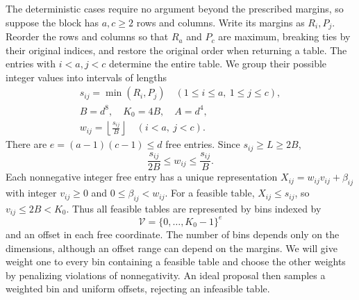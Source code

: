 The deterministic cases require no argument beyond the prescribed
margins, so suppose the block has $a,c\ge2$ rows and columns.  Write its
margins as $R_i,P_j$.  Reorder the rows and columns so that $R_a$ and $P_c$
are maximum, breaking ties by their original indices, and restore the
original order when returning a table.  The entries with $i<a,j<c$
determine the entire table.  We group their possible integer values into
intervals of lengths
\begin{equation}\label{eq:dense-scales}
 \begin{gathered}
 s_{ij}=\min(R_i,P_j)\quad(1\le i\le a,\ 1\le j\le c),\\
 B=d^8,\quad K_0=4B,\quad A=d^4,\\
 w_{ij}=\left\lfloor\frac{s_{ij}}B\right\rfloor
 \quad(i<a,\ j<c).
 \end{gathered}
\end{equation}
There are $e=(a-1)(c-1)\le d$ free entries.  Since $s_{ij}\ge L\ge2B$,
\begin{equation}\label{eq:width-bounds}
 \frac{s_{ij}}{2B}\le w_{ij}\le\frac{s_{ij}}B.
\end{equation}
Each nonnegative integer free entry has a unique representation
$X_{ij}=w_{ij}v_{ij}+\beta_{ij}$ with integer $v_{ij}\ge0$ and
$0\le\beta_{ij}<w_{ij}$.  For a feasible table, $X_{ij}\le s_{ij}$,
so $v_{ij}\le2B<K_0$.  Thus all feasible tables are represented by bins
indexed by
\[
 \mathcal V=\{0,\ldots,K_0-1\}^e
\]
and an offset in each free coordinate.  The number of bins depends only
on the dimensions, although an offset range can depend on the margins.
We will give weight one to every bin containing a feasible table and
choose the other weights by penalizing violations of nonnegativity.
An ideal proposal then samples a weighted bin and uniform offsets,
rejecting an infeasible table.

